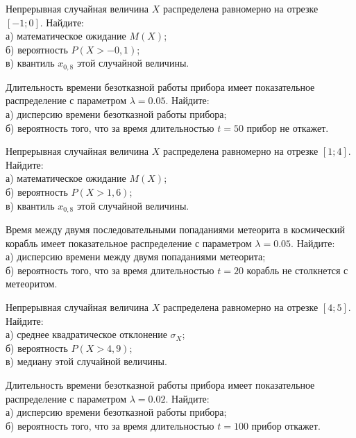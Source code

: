 \vfill

\newpage\setcounter{zad}{0}

\z Непрерывная случайная величина $X$ распределена равномерно на отрезке $[-1; 0]$. Найдите: \\ \quad а) математическое ожидание $M(X)$; \\ \quad б) вероятность $P(X>-0{,}1)$; \\ \quad в) квантиль $x_{0{,}8}$ этой случайной величины.


\vfill

\z Длительность времени безотказной работы прибора имеет показательное распределение с параметром $\lambda = 0.05$. Найдите: \\ \quad а) дисперсию времени безотказной работы прибора; \\ \quad б) вероятность того, что за время длительностью $t = 50$ прибор не откажет.
 

\vfill

\newpage\setcounter{zad}{0}

\z Непрерывная случайная величина $X$ распределена равномерно на отрезке $[1; 4]$. Найдите: \\ \quad а) математическое ожидание $M(X)$; \\ \quad б) вероятность $P(X>1{,}6)$; \\ \quad в) квантиль $x_{0{,}8}$ этой случайной величины.


\vfill

\z Время между двумя последовательными попаданиями метеорита в космический корабль имеет показательное распределение с параметром $\lambda = 0.05$. Найдите: \\ \quad а) дисперсию времени между двумя попаданиями метеорита; \\ \quad б) вероятность того, что за время длительностью $t = 20$ корабль не столкнется с метеоритом.
 

\vfill

\newpage\setcounter{zad}{0}

\z Непрерывная случайная величина $X$ распределена равномерно на отрезке $[4; 5]$. Найдите: \\ \quad а) среднее квадратическое отклонение $\sigma_X$; \\ \quad б) вероятность $P(X>4{,}9)$; \\ \quad в) медиану этой случайной величины.


\vfill

\z Длительность времени безотказной работы прибора имеет показательное распределение с параметром $\lambda = 0.02$. Найдите: \\ \quad а) дисперсию времени безотказной работы прибора; \\ \quad б) вероятность того, что за время длительностью $t = 100$ прибор  откажет.
 

